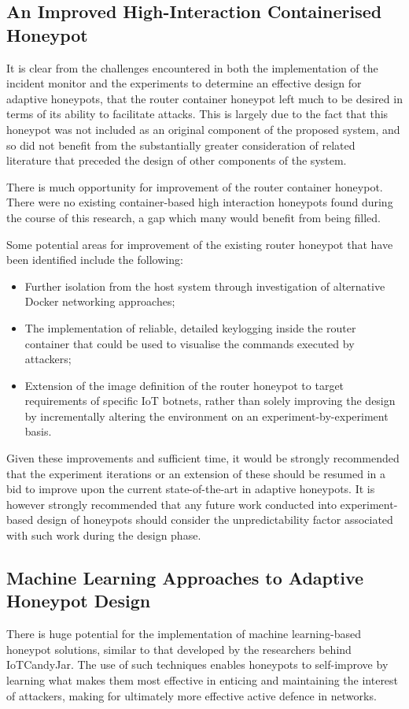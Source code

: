 \subsection{An Improved High-Interaction Containerised Honeypot}
It is clear from the challenges encountered in both the implementation of the incident monitor and the experiments to determine an effective design for adaptive honeypots, that the router container honeypot left much to be desired in terms of its ability to facilitate attacks. This is largely due to the fact that this honeypot was not included as an original component of the proposed system, and so did not benefit from the substantially greater consideration of related literature that preceded the design of other components of the system.

There is much opportunity for improvement of the router container honeypot. There were no existing container-based high interaction honeypots found during the course of this research, a gap which many would benefit from being filled.

Some potential areas for improvement of the existing router honeypot that have been identified include the following:
\begin{itemize}
    \item Further isolation from the host system through investigation of alternative Docker networking approaches;
    \item The implementation of reliable, detailed keylogging inside the router container that could be used to visualise the commands executed by attackers;
    \item Extension of the image definition of the router honeypot to target requirements of specific IoT botnets, rather than solely improving the design by incrementally altering the environment on an experiment-by-experiment basis. 
\end{itemize}

Given these improvements and sufficient time, it would be strongly recommended that the experiment iterations or an extension of these should be resumed in a bid to improve upon the current state-of-the-art in adaptive honeypots. It is however strongly recommended that any future work conducted into experiment-based design of honeypots should consider the unpredictability factor associated with such work during the design phase.


\subsection{Machine Learning Approaches to Adaptive Honeypot Design}
There is huge potential for the implementation of machine learning-based honeypot solutions, similar to that developed by the researchers behind IoTCandyJar. \cite{IoTCandyJar} The use of such techniques enables honeypots to self-improve by learning what makes them most effective in enticing and maintaining the interest of attackers, making for ultimately more effective active defence in networks.


